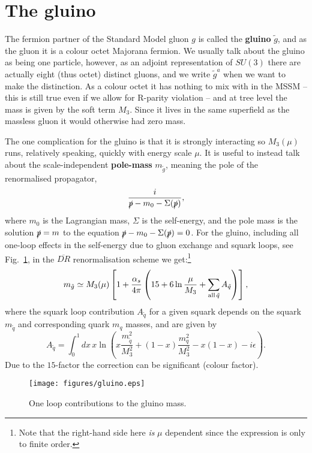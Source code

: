 \documentclass[notes.tex]{subfiles}
\begin{document}
\section{The gluino}
The fermion partner of the Standard Model gluon $g$ is called the {\bf gluino} $\tilde g$, and as the gluon it is a colour octet Majorana fermion. We usually talk about the gluino as being one particle, however, as an adjoint representation of $SU(3)$ there are actually eight  (thus octet) distinct gluons, and we write $\tilde g^a$ when we want to make the distinction. As a colour octet it has nothing to mix with in the MSSM -- this is still true even if we allow for R-parity violation -- and at tree level the mass is given by the soft term $M_3$. Since it lives in the same superfield as the massless gluon it would otherwise had zero mass. 

The one complication for the gluino is that it is strongly interacting so $M_3(\mu)$ runs, relatively speaking, quickly with energy scale $\mu$. It is useful to instead talk about the scale-independent {\bf pole-mass}  $m_{\tilde{g}}$, meaning the pole of the renormalised propagator,
\[ \frac{i}{\slashed{p}-m_0-\Sigma(\slashed p)},\]
where $m_0$ is the Lagrangian mass, $\Sigma$ is the self-energy, and the pole mass is the solution $\slashed p=m$ to the equation $\slashed{p}-m_0-\Sigma(\slashed p) =0$.
For the gluino, including all one-loop effects in the self-energy due to gluon exchange and squark loops, see Fig.~\ref{fig:cogluion}, in the $\overline{DR}$ renormalisation scheme we get:\footnote{Note that the right-hand side here {\it is} $\mu$ dependent since the expression is only to finite order.} 
\[m_{\tilde{g}} \simeq M_3(\mu)\left[1 + \frac{\alpha_s}{4\pi}\left(15 + 6\ln\frac{\mu}{M_3}+ \sum_{{\rm all}\,\tilde q} A_{\tilde{q}}\right) \right],\]
where the squark loop contribution $A_{\tilde q}$ for a given squark depends on the squark $m_{\tilde{q}}$ and corresponding quark $m_q$ masses, and are given by
\[A_{\tilde{q}} = \int_0^1dx\,x \ln\left(x \frac{m_{\tilde{q}}^2}{M_3^2} +(1-x)\frac{m_q^2}{M_3^2} - x(1-x) -i\epsilon\right).\]
Due to the $15$-factor the correction can be significant (colour factor).
\begin{figure}[h]
\begin{center}
\texttt{[image: figures/gluino.eps]} 
   \caption{One loop contributions to the gluino mass. \label{fig:cogluion}}
\end{center}
\end{figure}
\end{document}
